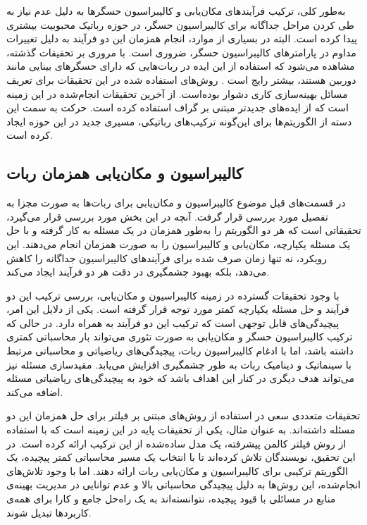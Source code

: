 به‌طور کلی، ترکیب فرآیندهای مکان‌یابی و کالیبراسیون حسگرها به دلیل عدم نیاز به طی کردن مراحل جداگانه برای کالیبراسیون حسگر، در حوزه رباتیک محبوبیت بیشتری پیدا کرده است. البته در بسیاری از موارد، انجام همزمان این دو فرآیند به دلیل تغییرات مداوم در پارامترهای کالیبراسیون حسگر، ضروری است. با مروری بر تحقیقات گذشته، مشاهده می‌شود که استفاده از این ایده در ربات‌هایی که دارای حسگرهای بینایی مانند دوربین هستند، بیشتر رایج است
\cite{zhou2014simultaneous, foxlin2002generalized}. 
روش‌های استفاده شده در این تحقیقات برای تعریف مسائل بهینه‌سازی کاری دشوار بوده‌است. 
\cite{reinke2019factor}
از آخرین تحقیقات انجام‌شده در این زمینه است که از ایده‌های جدیدتر مبتنی بر گراف استفاده کرده است. حرکت به سمت این دسته از الگوریتم‌ها برای این‌گونه ترکیب‌های رباتیکی، مسیری جدید در این حوزه ایجاد کرده است. 
  
 
\subsection{کالیبراسیون و مکان‌یابی همزمان ربات}

در قسمت‌های قبل موضوع کالیبراسیون و مکان‌یابی برای ربات‌ها به صورت مجزا به تفصیل مورد بررسی قرار گرفت. آنچه در این بخش مورد بررسی قرار می‌گیرد، تحقیقاتی است که هر دو الگوریتم را به‌طور همزمان در یک مسئله به کار گرفته و با حل یک مسئله یکپارچه، مکان‌یابی و کالیبراسیون را به صورت همزمان انجام می‌دهند. این رویکرد، نه تنها زمان صرف شده برای فرآیندهای کالیبراسیون جداگانه را کاهش می‌دهد، بلکه بهبود چشمگیری در دقت هر دو فرآیند ایجاد می‌کند.

با وجود تحقیقات گسترده در زمینه کالیبراسیون و مکان‌یابی، بررسی ترکیب این دو فرآیند و حل مسئله یکپارچه کمتر مورد توجه قرار گرفته است. یکی از دلایل این امر، پیچیدگی‌های قابل توجهی است که ترکیب این دو فرآیند به همراه دارد. در حالی که ترکیب کالیبراسیون حسگر و مکان‌یابی به صورت تئوری می‌تواند بار محاسباتی کمتری داشته باشد، اما با ادغام کالیبراسیون ربات، پیچیدگی‌های ریاضیاتی و محاسباتی مرتبط با سینماتیک و دینامیک ربات به طور چشمگیری افزایش می‌یابد. مقیدسازی مسئله نیز می‌تواند هدف دیگری در کنار این اهداف باشد که خود به پیچیدگی‌های ریاضیاتی مسئله اضافه می‌کند.

تحقیقات متعددی سعی در استفاده از روش‌های مبتنی بر فیلتر برای حل همزمان این دو مسئله داشته‌اند. به عنوان مثال، \cite{kummerle2011simultaneous} یکی از تحقیقات پایه در این زمینه است که با استفاده از روش فیلتر کالمن پیشرفته، یک مدل ساده‌شده از این ترکیب ارائه کرده است. در این تحقیق، نویسندگان تلاش کرده‌اند تا با انتخاب یک مسیر محاسباتی کمتر پیچیده، یک الگوریتم ترکیبی برای کالیبراسیون و مکان‌یابی ربات ارائه دهند. اما با وجود تلاش‌های انجام‌شده، این روش‌ها به دلیل پیچیدگی محاسباتی بالا و عدم توانایی در مدیریت بهینه‌ی منابع در مسائلی با قیود پیچیده، نتوانسته‌اند به یک راه‌حل جامع و کارا برای همه‌ی کاربردها تبدیل شوند.

